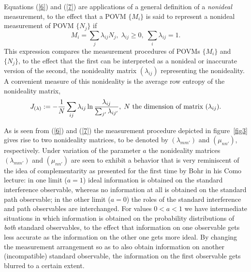 \documentclass[12pt]{article}
\begin{document}
{Equations (\ref{6}) and (\ref{7}) are applications of a general
definition of a \textit{nonideal} measurement\cite{MadM90}, to the
effect that a POVM $\{M_{i}\}$ is said to represent a nonideal
measurement of POVM $\{N_{j}\}$ if \[
 M_{i} = \sum_{j} \lambda_{ij} N_{j},\;
\lambda_{ij} \geq 0,\;\sum_{i} \lambda_{ij} = 1.\]
 This expression compares the measurement procedures of POVMs
 $\{M_i\}$ and $\{N_j\}$, to the effect that the first can be
 interpreted as a nonideal or inaccurate version of the second,
the nonideality matrix $(\lambda_{ij})$ representing the
nonideality.  A convenient measure of this nonideality is the
average row entropy of the nonideality matrix,
\begin{equation}\label{17}
J_{(\lambda)} := - \frac{1}{N} \sum_{ij} \lambda_{ij} \ln
\frac{\lambda_{ij}} {\sum_{j'} \lambda_{ij'}},\; N \mbox{ \rm the
dimension of matrix }(\lambda_{ij}).\end{equation}

 As is seen from (\ref{6}) and (\ref{7}) the measurement procedure
 depicted in figure~\ref{fig3} gives rise to two nonideality
 matrices, to be denoted by $(\lambda_{mm'})$ and $(\mu_{nn'})$,
 respectively. Under variation of the parameter $a$ the nonideality
 matrices $(\lambda_{mm'})$ and $(\mu_{nn'})$ are seen to
 exhibit a behavior that is very reminiscent of the idea of
complementarity as presented for the first time by Bohr in his
Como lecture\cite{Bohr27}: in one limit ($a=1$) ideal information
is obtained on the standard interference observable, whereas no
information at all is obtained on the standard path observable; in
the other limit ($a=0$) the roles of the standard interference and
path observables are interchanged. For values $0<a<1$ we have
intermediate situations in which information is obtained on the
probability distributions of \textit{both} standard observables,
to the effect that information on one observable gets less
accurate as the information on the other one gets more ideal. By
changing the measurement arrangement so as to also obtain
information on another (incompatible) standard observable, the
information on the first observable gets blurred to a certain
extent.

}
\end{document}

